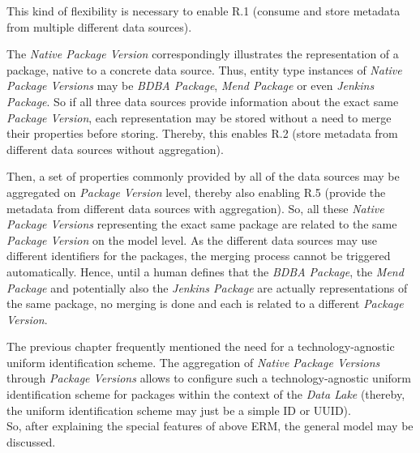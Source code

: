 This kind of flexibility is necessary to enable R.1 (consume and store metadata from multiple different data sources).\par 
The \emph{Native Package Version} correspondingly illustrates the representation of a package, native to a concrete data source. Thus, entity type instances of \emph{Native Package Versions} may be \emph{BDBA Package}, \emph{Mend Package} or even \emph{Jenkins Package}. So if all three data sources provide information about the exact same \emph{Package Version}, each representation may be stored without a need to merge their properties before storing. Thereby, this enables R.2 (store metadata from different data sources without aggregation).\par 
Then, a set of properties commonly provided by all of the data sources may be aggregated on \emph{Package Version} level, thereby also enabling R.5 (provide the metadata from different data sources with aggregation). So, all these \emph{Native Package Versions} representing the exact same package are related to the same \emph{Package Version} on the model level. As the different data sources may use different identifiers for the packages, the merging process cannot be triggered automatically. Hence, until a human defines that the \emph{BDBA Package}, the \emph{Mend Package} and potentially also the \emph{Jenkins Package} are actually representations of the same package, no merging is done and each is related to a different \emph{Package Version}.\par
The previous chapter frequently mentioned the need for a technology-agnostic uniform identification scheme. The aggregation of \emph{Native Package Versions} through \emph{Package Versions} allows to configure such a technology-agnostic uniform identification scheme for packages within the context of the \emph{Data Lake} (thereby, the uniform identification scheme may just be a simple ID or UUID).\\

\noindent So, after explaining the special features of above ERM, the general model may be discussed.\\

